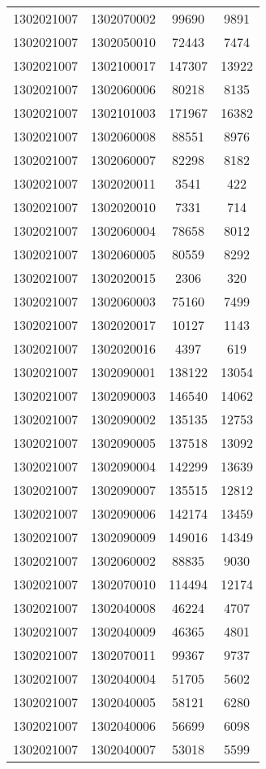 \begin{longtable}[h]{llcc}
		1302021007 & 1302070002 & 99690 & 9891\\
		1302021007 & 1302050010 & 72443 & 7474\\
		1302021007 & 1302100017 & 147307 & 13922\\
		1302021007 & 1302060006 & 80218 & 8135\\
		1302021007 & 1302101003 & 171967 & 16382\\
		1302021007 & 1302060008 & 88551 & 8976\\
		1302021007 & 1302060007 & 82298 & 8182\\
		1302021007 & 1302020011 & 3541 & 422\\
		1302021007 & 1302020010 & 7331 & 714\\
		1302021007 & 1302060004 & 78658 & 8012\\
		1302021007 & 1302060005 & 80559 & 8292\\
		1302021007 & 1302020015 & 2306 & 320\\
		1302021007 & 1302060003 & 75160 & 7499\\
		1302021007 & 1302020017 & 10127 & 1143\\
		1302021007 & 1302020016 & 4397 & 619\\
		1302021007 & 1302090001 & 138122 & 13054\\
		1302021007 & 1302090003 & 146540 & 14062\\
		1302021007 & 1302090002 & 135135 & 12753\\
		1302021007 & 1302090005 & 137518 & 13092\\
		1302021007 & 1302090004 & 142299 & 13639\\
		1302021007 & 1302090007 & 135515 & 12812\\
		1302021007 & 1302090006 & 142174 & 13459\\
		1302021007 & 1302090009 & 149016 & 14349\\
		1302021007 & 1302060002 & 88835 & 9030\\
		1302021007 & 1302070010 & 114494 & 12174\\
		1302021007 & 1302040008 & 46224 & 4707\\
		1302021007 & 1302040009 & 46365 & 4801\\
		1302021007 & 1302070011 & 99367 & 9737\\
		1302021007 & 1302040004 & 51705 & 5602\\
		1302021007 & 1302040005 & 58121 & 6280\\
		1302021007 & 1302040006 & 56699 & 6098\\
		1302021007 & 1302040007 & 53018 & 5599\\

\end{longtable}
